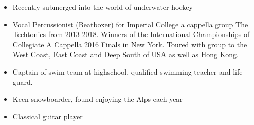 
\medskip
\begin{itemize}
    \item Recently submerged into the world of underwater hockey
    \item Vocal Percussionist (Beatboxer) for Imperial College a cappella group \href{http://www.thetechtonics.co.uk/}{The Techtonics}
    from 2013-2018. \newline
    Winners of the International Championships of Collegiate A Cappella 2016 Finals in New York. \newline
    Toured with group to the West Coast, East Coast and Deep South of USA as well as Hong Kong.
    \item Captain of swim team at highschool, qualified swimming teacher and life guard.
    \item Keen snowboarder, found enjoying the Alps each year
    \item Classical guitar player
\end{itemize}
